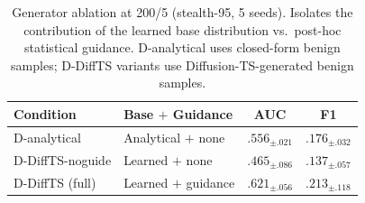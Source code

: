 
\begin{table}[h]
\centering
\caption{
  Generator ablation at 200/5 (stealth-95, 5 seeds).
  Isolates the contribution of the learned base distribution vs.\
  post-hoc statistical guidance.
  D-analytical uses closed-form benign samples;
  D-DiffTS variants use Diffusion-TS-generated benign samples.
}
\label{tab:gen_ablation}
\begin{tabular}{@{}llcc@{}}
\toprule
Condition & Base $+$ Guidance & AUC & F1 \\
\midrule
D-analytical      & Analytical $+$ none     & $.556_{\pm.021}$ & $.176_{\pm.032}$ \\
D-DiffTS-noguide  & Learned $+$ none        & $.465_{\pm.086}$ & $.137_{\pm.057}$ \\
D-DiffTS (full)   & Learned $+$ guidance    & $.621_{\pm.056}$ & $.213_{\pm.118}$ \\
\bottomrule
\end{tabular}
\end{table}
